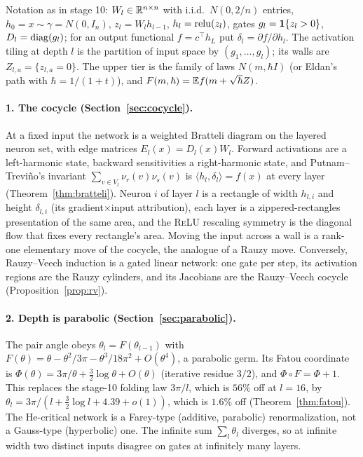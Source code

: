 \label{sec:summary}
Notation as in stage 10: $W_l\in\mathbb R^{n\times n}$ with i.i.d.\ $N(0,2/n)$ entries, $h_0=x\sim\gamma=N(0,I_n)$, $z_l=W_lh_{l-1}$,
$h_l=\operatorname{relu}(z_l)$, gates $g_l=\mathbf 1\{z_l>0\}$, $D_l=\operatorname{diag}(g_l)$; for an output functional $f=c^{\top}h_L$ put $\delta_l=\partial f/\partial h_l$.
The activation tiling at depth $l$ is the partition of input space by $(g_1,\dots,g_l)$; its walls are $Z_{l,a}=\{z_{l,a}=0\}$. The
upper tier is the family of laws $N(m,\hbar I)$ (or Eldan's path with $\hbar=1/(1+t)$), and $F(m,\hbar)=\mathbb E f(m+\sqrt\hbar Z)$.

\paragraph{1. The cocycle (Section~\ref{sec:cocycle}).} At a fixed input the network is a weighted Bratteli diagram on the layered
neuron set, with edge matrices $E_l(x)=D_l(x)W_l$. Forward activations are a left-harmonic state, backward sensitivities a right-harmonic
state, and Putnam--Trevi\~no's invariant $\sum_{v\in V_l}\nu_r(v)\nu_s(v)$ is $\langle h_l,\delta_l\rangle=f(x)$ at every layer
(Theorem~\ref{thm:bratteli}). Neuron $i$ of layer $l$ is a rectangle of width $h_{l,i}$ and height $\delta_{l,i}$ (its gradient$\times$input
attribution), each layer is a zippered-rectangles presentation of the same area, and the \textsc{ReLU} rescaling symmetry is the diagonal
flow that fixes every rectangle's area. Moving the input across a wall is a rank-one elementary move of the cocycle, the analogue of a
Rauzy move. Conversely, Rauzy--Veech induction is a gated linear network: one gate per step, its activation regions are the Rauzy
cylinders, and its Jacobians are the Rauzy--Veech cocycle (Proposition~\ref{prop:rv}).

\paragraph{2. Depth is parabolic (Section~\ref{sec:parabolic}).} The pair angle obeys $\theta_{l}=F(\theta_{l-1})$ with
$F(\theta)=\theta-\theta^2/3\pi-\theta^3/18\pi^2+O(\theta^4)$, a parabolic germ. Its Fatou coordinate is
$\Phi(\theta)=3\pi/\theta+\tfrac32\log\theta+O(\theta)$ (iterative residue $3/2$), and $\Phi\circ F=\Phi+1$. This replaces the stage-10
folding law $3\pi/l$, which is $56\%$ off at $l=16$, by $\theta_l=3\pi/(l+\tfrac32\log l+4.39+o(1))$, which is $1.6\%$ off
(Theorem~\ref{thm:fatou}). The He-critical network is a Farey-type (additive, parabolic) renormalization, not a Gauss-type (hyperbolic)
one. The infinite sum $\sum_l\theta_l$ diverges, so at infinite width two distinct inputs disagree on gates at infinitely many layers.

